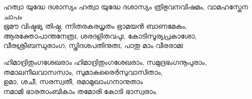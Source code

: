 \begin{enumerate}

\begin{slokam}{\VSr}{\Unk}{ഹത്വാ യുദ്ധേ ദശാസ്യം}
ഹത്വാ യുദ്ധേ ദശാസ്യം ത്രിഭുവനവിഷമം, വാമഹസ്തേന ചാപം\\
ഭൂമൗ വിഷ്ടഭ്യ തിഷ്ഠ, ന്നിതരകരധൃതം ഭ്രാമയൻ ബാണമേകം,\\
ആരക്തോപാന്തനേത്രഃ, ശരദളിതവപുഃ, കോടിസൂര്യപ്രകാശോ,\\
വീരശ്രീബന്ധുരാംഗ, സ്ത്രിദശപതിനുതഃ, പാതു മാം വീരരാമഃ
\end{slokam}



\begin{slokam}{\VPc}{\RV}{ഹിമാദ്രിതുംഗശേഖരാം}
ഹിമാദ്രിതുംഗശേഖരാം, സമുദ്രഭംഗനൂപുരാം,\\
തമാലനീലവാസസാം, സുമാകരൈർസുവാസിതാം,\\
ഉമാ, ശചീ, സരസ്വതീ, രമാമുഖാംഗനാനുതാം\\
നമാമി ഭാരതാംബികാം തമോ\prash{}രി കോടി ഭാസ്വരാം.
\end{slokam}


\end{enumerate}

